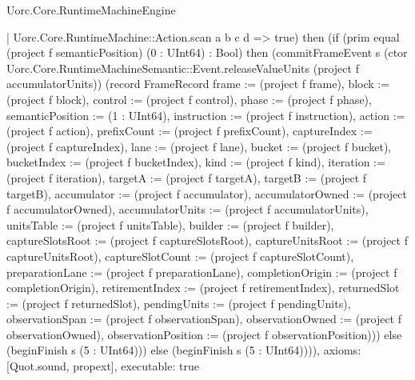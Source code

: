 \begin{lexlean}{Uorc.Core.RuntimeMachineEngine}
\begin{semanticmodule}
{      | Uorc.Core.RuntimeMachine::Action.scan a b c d => true) then (if (prim equal (project f semanticPosition) (0 : UInt64) : Bool) then (commitFrameEvent s (ctor Uorc.Core.RuntimeMachineSemantic::Event.releaseValueUnits (project f accumulatorUnits)) (record FrameRecord {frame := (project f frame), block := (project f block), control := (project f control), phase := (project f phase), semanticPosition := (1 : UInt64), instruction := (project f instruction), action := (project f action), prefixCount := (project f prefixCount), captureIndex := (project f captureIndex), lane := (project f lane), bucket := (project f bucket), bucketIndex := (project f bucketIndex), kind := (project f kind), iteration := (project f iteration), targetA := (project f targetA), targetB := (project f targetB), accumulator := (project f accumulator), accumulatorOwned := (project f accumulatorOwned), accumulatorUnits := (project f accumulatorUnits), unitsTable := (project f unitsTable), builder := (project f builder), captureSlotsRoot := (project f captureSlotsRoot), captureUnitsRoot := (project f captureUnitsRoot), captureSlotCount := (project f captureSlotCount), preparationLane := (project f preparationLane), completionOrigin := (project f completionOrigin), retirementIndex := (project f retirementIndex), returnedSlot := (project f returnedSlot), pendingUnits := (project f pendingUnits), observationSpan := (project f observationSpan), observationOwned := (project f observationOwned), observationPosition := (project f observationPosition)})) else (beginFinish s (5 : UInt64))) else (beginFinish s (5 : UInt64)))),
  axioms: [Quot.sound, propext],
  executable: true
}


\end{semanticmodule}
\end{lexlean}
